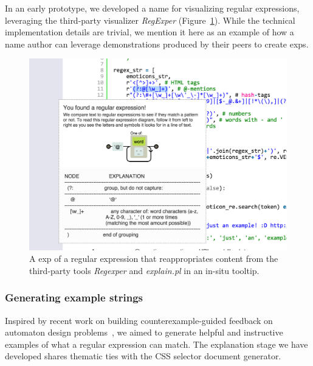 In an early prototype, we developed a \Gls{name} for visualizing regular expressions, leveraging the third-party visualizer \emph{RegExper} (Figure~\ref{fig:regex_visualization}).
While the technical implementation details are trivial, we mention it here as an example of how a \Gls{name} author can leverage demonstrations produced by their peers to create \glspl{exp}.

\begin{figure}
\centering
\includegraphics[width=\columnwidth]{figures/explain_on_select}
\caption{A \gls{exp} of a regular expression that reappropriates content from the third-party tools \emph{Regexper} and \emph{explain.pl} in an in-situ tooltip.}
\label{fig:regex_visualization}
\end{figure}

\subsubsection{Generating example strings}

Inspired by recent work on building counterexample-guided feedback on automaton design problems~\cite{dantoni_how_2015}, we aimed to generate helpful and instructive examples of what a regular expression can match.
The explanation stage we have developed shares thematic ties with the CSS selector document generator. 
\fi

